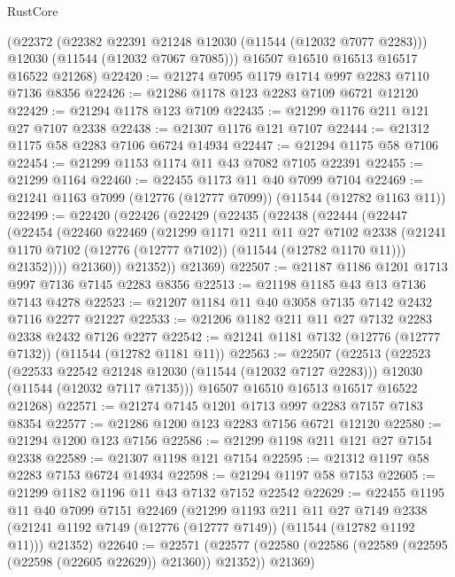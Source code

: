 \begin{lexlean}{RustCore}
\begin{coremodule}
      (@22372
        (@22382 @22391 @21248 @12030 (@11544 (@12032 @7077 @2283)))
        @12030
        (@11544 (@12032 @7067 @7085)))
      @16507
      @16510
      @16513
      @16517
      @16522
      @21268)
@22420 := @21274 @7095 @1179 @1714 @997 @2283 @7110 @7136 @8356
@22426 := @21286 @1178 @123 @2283 @7109 @6721 @12120
@22429 := @21294 @1178 @123 @7109
@22435 := @21299 @1176 @211 @121 @27 @7107 @2338
@22438 := @21307 @1176 @121 @7107
@22444 := @21312 @1175 @58 @2283 @7106 @6724 @14934
@22447 := @21294 @1175 @58 @7106
@22454 := @21299 @1153 @1174 @11 @43 @7082 @7105 @22391
@22455 := @21299 @1164
@22460 := @22455 @1173 @11 @40 @7099 @7104
@22469 := @21241 @1163 @7099 (@12776 (@12777 @7099)) (@11544 (@12782 @1163 @11))
@22499 := @22420
    (@22426
      (@22429
        (@22435
          (@22438
            (@22444
              (@22447
                (@22454
                  (@22460
                    @22469
                    (@21299
                      @1171
                      @211
                      @11
                      @27
                      @7102
                      @2338
                      (@21241 @1170 @7102 (@12776 (@12777 @7102)) (@11544 (@12782 @1170 @11)))
                      @21352))))
              @21360))
          @21352))
      @21369)
@22507 := @21187 @1186 @1201 @1713 @997 @7136 @7145 @2283 @8356
@22513 := @21198 @1185 @43 @13 @7136 @7143 @4278
@22523 := @21207 @1184 @11 @40 @3058 @7135 @7142 @2432 @7116 @2277 @21227
@22533 := @21206 @1182 @211 @11 @27 @7132 @2283 @2338 @2432 @7126 @2277
@22542 := @21241 @1181 @7132 (@12776 (@12777 @7132)) (@11544 (@12782 @1181 @11))
@22563 := @22507
    (@22513
      (@22523
        (@22533 @22542 @21248 @12030 (@11544 (@12032 @7127 @2283)))
        @12030
        (@11544 (@12032 @7117 @7135)))
      @16507
      @16510
      @16513
      @16517
      @16522
      @21268)
@22571 := @21274 @7145 @1201 @1713 @997 @2283 @7157 @7183 @8354
@22577 := @21286 @1200 @123 @2283 @7156 @6721 @12120
@22580 := @21294 @1200 @123 @7156
@22586 := @21299 @1198 @211 @121 @27 @7154 @2338
@22589 := @21307 @1198 @121 @7154
@22595 := @21312 @1197 @58 @2283 @7153 @6724 @14934
@22598 := @21294 @1197 @58 @7153
@22605 := @21299 @1182 @1196 @11 @43 @7132 @7152 @22542
@22629 := @22455
    @1195
    @11
    @40
    @7099
    @7151
    @22469
    (@21299
      @1193
      @211
      @11
      @27
      @7149
      @2338
      (@21241 @1192 @7149 (@12776 (@12777 @7149)) (@11544 (@12782 @1192 @11)))
      @21352)
@22640 := @22571
    (@22577 (@22580 (@22586 (@22589 (@22595 (@22598 (@22605 @22629)) @21360)) @21352)) @21369)

\end{coremodule}
\end{lexlean}
